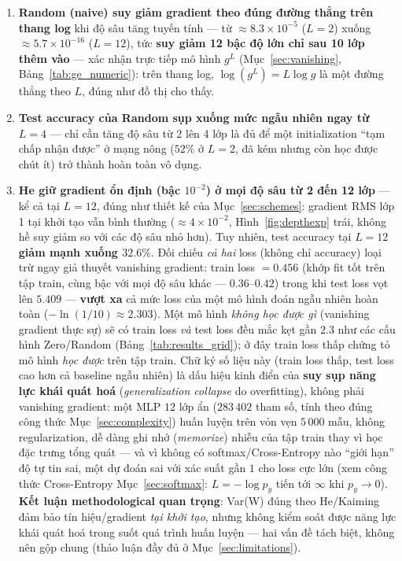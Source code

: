 \documentclass[12pt,a4paper]{report}
\newcommand{\en}[1]{\textit{#1}}
\begin{document}
\begin{enumerate}
\item \textbf{Random (naive) suy giảm gradient theo đúng đường thẳng trên
  thang log} khi độ sâu tăng tuyến tính --- từ $\approx8.3\times10^{-5}$
  ($L{=}2$) xuống $\approx5.7\times10^{-16}$ ($L{=}12$), tức
  \textbf{suy giảm 12 bậc độ lớn chỉ sau 10 lớp thêm vào} --- xác nhận
  trực tiếp mô hình $g^L$ (Mục~\ref{sec:vanishing}, Bảng~\ref{tab:ge_numeric}):
  trên thang log, $\log(g^L)=L\log g$ là một đường thẳng theo $L$, đúng
  như đồ thị cho thấy.
\item \textbf{Test accuracy của Random sụp xuống mức ngẫu nhiên ngay từ
  $L{=}4$} --- chỉ cần tăng độ sâu từ 2 lên 4 lớp là đủ để một
  initialization ``tạm chấp nhận được'' ở mạng nông ($52\%$ ở $L{=}2$, đã
  kém nhưng còn học được chút ít) trở thành hoàn toàn vô dụng.
\item \textbf{He giữ gradient ổn định (bậc $10^{-2}$) ở mọi độ sâu từ 2
  đến 12 lớp} --- kể cả tại $L{=}12$, đúng như thiết kế của
  Mục~\ref{sec:schemes}: gradient RMS lớp 1 tại khởi tạo vẫn bình thường
  ($\approx4\times10^{-2}$, Hình~\ref{fig:depthexp} trái, không hề suy
  giảm so với các độ sâu nhỏ hơn). Tuy nhiên, test accuracy tại $L{=}12$
  \textbf{giảm mạnh xuống $32.6\%$}. Đối chiếu \emph{cả hai} loss (không
  chỉ accuracy) loại trừ ngay giả thuyết vanishing gradient:
  train loss $=0.456$ (khớp fit tốt trên tập train, cùng bậc với mọi độ
  sâu khác --- $0.36$--$0.42$) trong khi test loss vọt lên
  $5.409$ --- \textbf{vượt xa} cả mức loss của một mô hình đoán ngẫu
  nhiên hoàn toàn ($-\ln(1/10)\approx2.303$). Một mô hình \emph{không
  học được gì} (vanishing gradient thực sự) sẽ có train loss \emph{và}
  test loss đều mắc kẹt gần $2.3$ như các cấu hình Zero/Random
  (Bảng~\ref{tab:results_grid}); ở đây train loss thấp chứng tỏ mô hình
  \emph{học được} trên tập train. Chữ ký số liệu này (train loss thấp,
  test loss cao hơn cả baseline ngẫu nhiên) là dấu hiệu kinh điển của
  \textbf{suy sụp năng lực khái quát hoá} (\en{generalization collapse}
  do overfitting), không phải vanishing gradient: một MLP $12$ lớp ẩn
  ($283\,402$ tham số, tính theo đúng công thức Mục~\ref{sec:complexity})
  huấn luyện trên vỏn vẹn $5\,000$ mẫu, không regularization, dễ dàng ghi
  nhớ (\en{memorize}) nhiễu của tập train thay vì học đặc trưng tổng
  quát --- và vì không có softmax/Cross-Entropy nào ``giới hạn'' độ tự
  tin sai, một dự đoán sai với xác suất gần $1$ cho loss cực lớn (xem
  công thức Cross-Entropy Mục~\ref{sec:softmax}: $L=-\log p_{y}$ tiến tới
  $\infty$ khi $p_y\to0$). \textbf{Kết luận methodological quan trọng}:
  Var(W) đúng theo He/Kaiming đảm bảo tín hiệu/gradient \emph{tại khởi
  tạo}, nhưng không kiểm soát được năng lực khái quát hoá trong suốt quá
  trình huấn luyện --- hai vấn đề tách biệt, không nên gộp chung (thảo
  luận đầy đủ ở Mục~\ref{sec:limitations}).
\end{enumerate}
\end{document}
